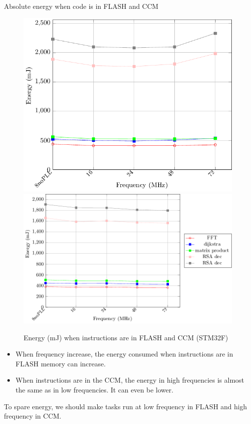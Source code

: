 \documentclass[
	11pt, %
]{beamer}
\begin{document}
\begin{frame}{Absolute energy when code is in FLASH and CCM}
	\begin{figure}
		\includegraphics[scale = 0.4]{data/stm32f_v2/abs/abs_flash_energy32f.pdf}
		\includegraphics[scale = 0.4]{data/stm32f_v2/abs/abs_ccm_energy32f.pdf}
		\caption{Energy (mJ) when instructions are in FLASH and CCM (STM32F)}
	\end{figure}
	\begin{itemize}
		\item When frequency increase, the energy consumed when instructions are in FLASH memory can increase.
		\item When instructions are in the CCM, the energy in high frequencies is almost the same as in low frequencies. It can even be lower. 
	\end{itemize}
	To spare energy, we should make tasks run at low frequency in FLASH and high frequency in CCM.
\end{frame}
\end{document}
